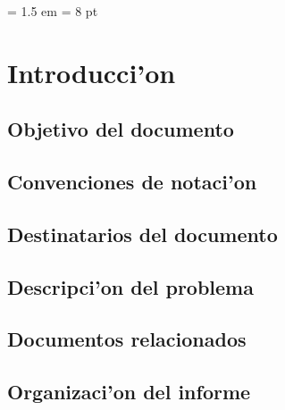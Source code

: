 \documentclass[a4paper, 10pt,titlepage]{article}
\author{Echevarr'ia - Giusto - Farjat - Freijo }
\begin{document}
\parindent = 1.5 em 
\parskip = 8 pt %

\newcommand{\todo}{{\large\textbf{TODO: }}}
\newcommand{\paso}{\textsc{Paso }}
\newcommand{\func}[1]{\verb"#1"}
% 
%  



\tableofcontents


\section{Introducci'on}

    \subsection{ Objetivo del documento	}
    \subsection{ Convenciones de notaci'on	}
    \subsection{ Destinatarios del documento	}
    \subsection{ Descripci'on del problema 	}
    \subsection{ Documentos relacionados	}
    \subsection{ Organizaci'on del informe	}
\end{document}
